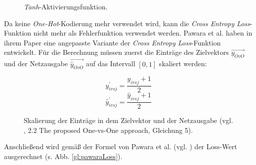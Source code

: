 \begin{figure}[H]
\begin{adjustbox}{width=.65\textwidth, center}

\end{adjustbox}
\caption{\textit{Tanh}-Aktivierungsfunktion.}
\label{fig:tanh}
\end{figure}
Da keine \textit{One-Hot}-Kodierung mehr verwendet wird, kann die \textit{Cross Entropy Loss}-Funktion nicht mehr als Fehlerfunktion verwendet werden. Pawara et al. haben in ihrem Paper \cite{pawaraPaper} eine angepasste Variante der \textit{Cross Entropy Loss}-Funktion entwickelt. Für die Berechnung müssen zuerst die Einträge des Zielvektors $\overrightarrow{y_{OvO}}$ und der Netzausgabe $\overrightarrow{\widehat{y}_{OvO}}$ auf das Intervall $[0, 1]$ skaliert werden:
\begin{figure}[H]
\[y_{ivsj}^{'} = \frac{y_{ivsj} + 1}{2}\]
\[\widehat{y}_{ivsj}^{'} = \frac{\widehat{y}_{ivsj} + 1}{2}\]
\caption{Skalierung der Einträge in dem Zielvektor und der Netzausgabe (vgl. \cite{pawaraPaper}, 2.2 The proposed One-vs-One approach, Gleichung 5).}
\label{gl:pawaraSkalierung}
\end{figure}

Anschließend wird gemäß der Formel von Pawara et al. (vgl. \cite{pawaraPaper}) der Loss-Wert ausgerechnet (s. Abb. \ref{gl:pawaraLoss}).

